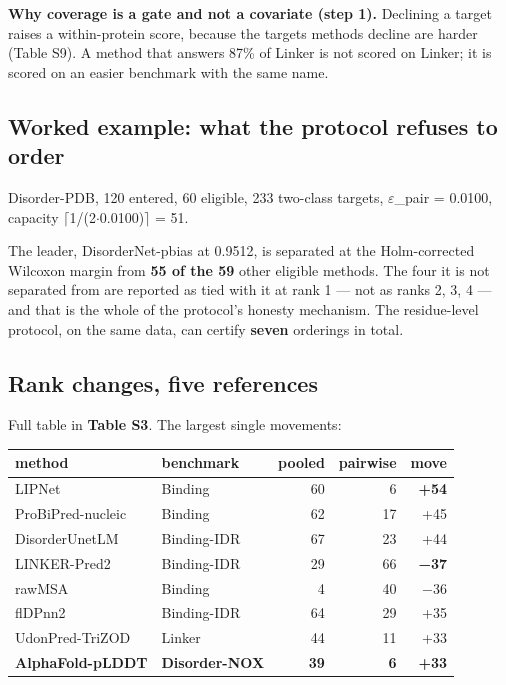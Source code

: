 \textbf{Why coverage is a gate and not a covariate (step 1).} Declining a target
raises a within-protein score, because the targets methods decline are harder
(Table S9). A method that answers 87\% of Linker is not scored on Linker; it is
scored on an easier benchmark with the same name.


\subsection*{Worked example: what the protocol refuses to order}

Disorder-PDB, 120 entered, 60 eligible, 233 two-class targets, $\varepsilon$\_pair = 0.0100,
capacity $\lceil$1/(2$\cdot$0.0100)$\rceil$ = 51.

The leader, DisorderNet-pbias at 0.9512, is separated at the Holm-corrected
Wilcoxon margin from \textbf{55 of the 59} other eligible methods. The four it is not
separated from are reported as tied with it at rank 1 --- not as ranks 2, 3, 4 ---
and that is the whole of the protocol's honesty mechanism. The residue-level
protocol, on the same data, can certify \textbf{seven} orderings in total.


\subsection*{Rank changes, five references}

Full table in \textbf{Table S3}. The largest single movements:

\begin{center}\footnotesize
\begin{tabular}{llrrr}
\toprule
\textbf{method} & \textbf{benchmark} & \textbf{pooled} & \textbf{pairwise} & \textbf{move} \\
\midrule
LIPNet & Binding & 60 & 6 & \textbf{+54} \\
ProBiPred-nucleic & Binding & 62 & 17 & +45 \\
DisorderUnetLM & Binding-IDR & 67 & 23 & +44 \\
LINKER-Pred2 & Binding-IDR & 29 & 66 & \textbf{−37} \\
rawMSA & Binding & 4 & 40 & −36 \\
flDPnn2 & Binding-IDR & 64 & 29 & +35 \\
UdonPred-TriZOD & Linker & 44 & 11 & +33 \\
\textbf{AlphaFold-pLDDT} & \textbf{Disorder-NOX} & \textbf{39} & \textbf{6} & \textbf{+33} \\
\bottomrule
\end{tabular}
\end{center}


